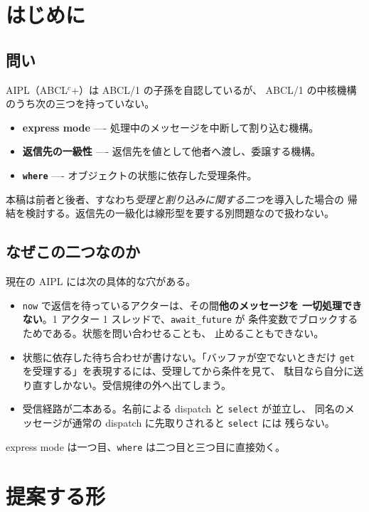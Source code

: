 \documentclass[11pt,a4paper]{ltjsarticle}
\theoremstyle{remark}
\begin{document}
\section{はじめに}

\subsection{問い}

AIPL（ABCL$^{c}$+）は ABCL/1 の子孫を自認しているが、
ABCL/1 の中核機構のうち次の三つを持っていない。

\begin{itemize}
\item \textbf{express mode} ---- 処理中のメッセージを中断して割り込む機構。
\item \textbf{返信先の一級性} ---- 返信先を値として他者へ渡し、委譲する機構。
\item \textbf{\texttt{where}} ---- オブジェクトの状態に依存した受理条件。
\end{itemize}

本稿は前者と後者、すなわち\emph{受理と割り込みに関する二つ}を導入した場合の
帰結を検討する。返信先の一級化は線形型を要する別問題なので扱わない。

\subsection{なぜこの二つなのか}

現在の AIPL には次の具体的な穴がある。

\begin{itemize}
\item \texttt{now} で返信を待っているアクターは、その間\textbf{他のメッセージを
  一切処理できない}。1 アクター 1 スレッドで、\texttt{await\_future} が
  条件変数でブロックするためである。状態を問い合わせることも、
  止めることもできない。
\item 状態に依存した待ち合わせが書けない。「バッファが空でないときだけ
  \texttt{get} を受理する」を表現するには、受理してから条件を見て、
  駄目なら自分に送り直すしかない。受信規律の外へ出てしまう。
\item 受信経路が二本ある。名前による dispatch と \texttt{select} が並立し、
  同名のメッセージが通常の dispatch に先取りされると \texttt{select} には
  残らない。
\end{itemize}

express mode は一つ目、\texttt{where} は二つ目と三つ目に直接効く。

\section{提案する形}
\end{document}
